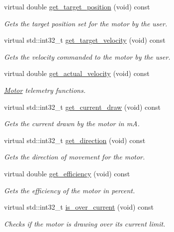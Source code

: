 \begin{DoxyCompactItemize}
virtual double \hyperlink{classpros_1_1Motor_a7ad83a73bf15b94aaad8d10970bb254c}{get\+\_\+target\+\_\+position} (void) const
\begin{DoxyCompactList}\small\item\em Gets the target position set for the motor by the user. \end{DoxyCompactList}\item 
virtual std\+::int32\+\_\+t \hyperlink{classpros_1_1Motor_a8b8148a179cfadd579c8d4c82eb5873f}{get\+\_\+target\+\_\+velocity} (void) const
\begin{DoxyCompactList}\small\item\em Gets the velocity commanded to the motor by the user. \end{DoxyCompactList}\item 
virtual double \hyperlink{classpros_1_1Motor_a696494a4e7c675f7007d41b947f9ea63}{get\+\_\+actual\+\_\+velocity} (void) const
\begin{DoxyCompactList}\small\item\em \hyperlink{classpros_1_1Motor}{Motor} telemetry functions. \end{DoxyCompactList}\item 
virtual std\+::int32\+\_\+t \hyperlink{classpros_1_1Motor_a502eaf3859452721e2327e53ab3f34d8}{get\+\_\+current\+\_\+draw} (void) const
\begin{DoxyCompactList}\small\item\em Gets the current drawn by the motor in mA. \end{DoxyCompactList}\item 
virtual std\+::int32\+\_\+t \hyperlink{classpros_1_1Motor_acea42a96da651f72f138ea268c76217f}{get\+\_\+direction} (void) const
\begin{DoxyCompactList}\small\item\em Gets the direction of movement for the motor. \end{DoxyCompactList}\item 
virtual double \hyperlink{classpros_1_1Motor_a6f0b39894abf612a1965a66224893c71}{get\+\_\+efficiency} (void) const
\begin{DoxyCompactList}\small\item\em Gets the efficiency of the motor in percent. \end{DoxyCompactList}\item 
virtual std\+::int32\+\_\+t \hyperlink{classpros_1_1Motor_a2d34c92effccfbb4d2f45319bf4bd272}{is\+\_\+over\+\_\+current} (void) const
\begin{DoxyCompactList}\small\item\em Checks if the motor is drawing over its current limit. \end{DoxyCompactList}\item 

\end{DoxyCompactItemize}
